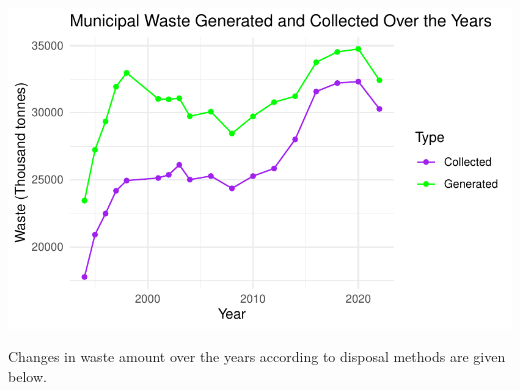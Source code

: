 \documentclass[
  11pt,
  a4paper,
  DIV=11,
  numbers=noendperiod]{scrartcl}
\begin{document}
\includegraphics{project_files/figure-pdf/unnamed-chunk-22-1.pdf}

Changes in waste amount over the years according to disposal methods are
given below.
\end{document}
